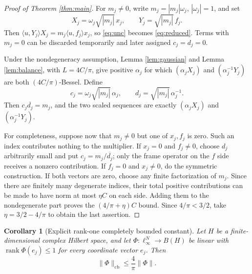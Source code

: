 \documentclass[11pt]{article}
\newtheorem{corollary}{Corollary}
\begin{document}
\begin{proof}[Proof of Theorem \ref{thm:main}]
For $m_j\neq0$, write $m_j=|m_j|\omega_j$, $|\omega_j|=1$, and set
\[
 X_j=\omega_j\sqrt{|m_j|}\,x_j,\qquad
 Y_j=\sqrt{|m_j|}\,f_j.
\]
Then $\langle u,Y_j\rangle X_j=m_j\langle u,f_j\rangle x_j$, so
\eqref{eq:unc} becomes \eqref{eq:reduced}.  Terms with $m_j=0$ can be
discarded temporarily and later assigned $c_j=d_j=0$.

Under the nondegeneracy assumption, Lemma \ref{lem:gaussian} and Lemma
\ref{lem:balance}, with $L=4C/\pi$, give positive $\alpha_j$ for which
$(\alpha_jX_j)$ and $(\alpha_j^{-1}Y_j)$ are both $(4C/\pi)$-Bessel.
Define
\[
 c_j=\omega_j\sqrt{|m_j|}\,\alpha_j,\qquad
 d_j=\sqrt{|m_j|}\,\alpha_j^{-1}.
\]
Then $c_j\overline{d_j}=m_j$, and the two scaled sequences are exactly
$(\alpha_jX_j)$ and $(\alpha_j^{-1}Y_j)$.

For completeness, suppose now that $m_j\neq0$ but one of $x_j,f_j$ is
zero.  Such an index contributes nothing to the multiplier.  If $x_j=0$
and $f_j\neq0$, choose $d_j$ arbitrarily small and put
$c_j=m_j/\overline{d_j}$; only the frame operator on the $f$ side receives
a nonzero contribution.  If $f_j=0$ and $x_j\neq0$, do the symmetric
construction.  If both vectors are zero, choose any finite factorization of
$m_j$.  Since there are finitely many degenerate indices, their
total positive contributions can be made to have norm at most $\eta C$ on
each side.  Adding them to the nondegenerate part proves the
$(4/\pi+\eta)C$ bound.  Since $4/\pi<3/2$, take
$\eta=3/2-4/\pi$ to obtain the last assertion.
\end{proof}

\begin{corollary}[Explicit rank-one completely bounded constant]\label{cor:cb}
Let $H$ be a finite-dimensional complex Hilbert space, and let
$\Phi:\ell_\infty^N\to B(H)$ be linear with
$\operatorname{rank}\Phi(e_j)\leq1$ for every coordinate vector $e_j$.
Then
\[
  \|\Phi\|_{\mathrm{cb}}\leq\frac4\pi\|\Phi\|.
\]
\end{corollary}
\end{document}
